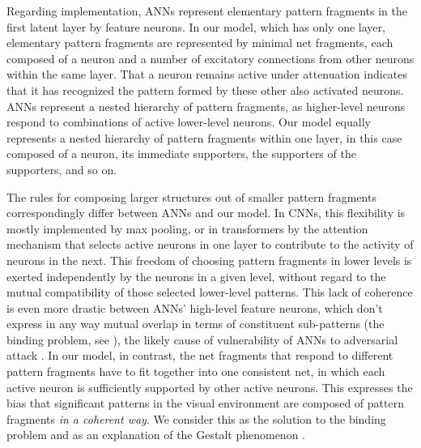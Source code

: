 \documentclass[12pt]{article}
\begin{document}
Regarding implementation, ANNs represent elementary pattern fragments in the first latent layer by feature neurons. In our model, which has only one layer, elementary pattern fragments are represented by minimal net fragments, each composed of a neuron and a number of excitatory connections from other neurons within the same layer. That a neuron remains active under attenuation indicates that it has recognized the pattern formed by these other also activated neurons. ANNs represent a nested hierarchy of pattern fragments, as higher-level neurons respond to combinations of active lower-level neurons.  Our model equally represents a nested hierarchy of pattern fragments within one layer, in this case composed of a neuron, its immediate supporters, the supporters of the supporters, and so on. 

The rules for composing larger structures out of smaller pattern fragments correspondingly differ between ANNs and our model. In CNNs, this flexibility is mostly implemented by max pooling, or in transformers by the attention mechanism that selects active neurons in one layer to contribute to the activity of neurons in the next. This freedom of choosing pattern fragments in lower levels is exerted independently by the neurons in a given level, without regard to the mutual compatibility of those selected lower-level patterns. This lack of coherence is even more drastic between ANNs' high-level feature neurons, which don't express in any way mutual overlap in terms of constituent sub-patterns (the binding problem, see \citet{Greff2020}), the likely cause of vulnerability of ANNs to adversarial attack \citep{Leadholm2022}. In our model, in contrast,  the net fragments that respond to different pattern fragments have to fit together into one consistent net, in which each active neuron is sufficiently supported by other active neurons. This expresses the bias that significant patterns in the visual environment are composed of pattern fragments {\it in a coherent way}. We consider this as the solution to the binding problem \citep{Greff2020} and as an explanation of the Gestalt phenomenon \citep{Wagemans2012}.
\end{document}
